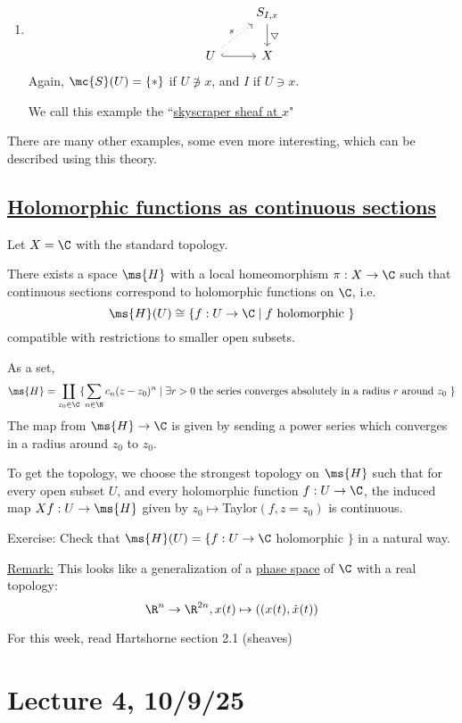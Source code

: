 \documentclass[x11names,reqno,14pt]{extarticle}
\begin{document}
\begin{enumerate}
\item 
\[
\begin{tikzcd}
& S_{I,x} \ar[d, "\bigtriangledown"] \\
U \ar[ur,dotted,"s"] \ar[r,hook] & X 
\end{tikzcd}
\]
Again, $\mc{S}(U) = \{*\}$ if $U \not\ni x$, and $I$ if $U \ni x$. 

We call this example the ``\underline{skyscraper sheaf at $x$}"

\end{enumerate}

There are many other examples, some even more interesting, which can be described using this theory.

\subsection*{\underline{Holomorphic functions as continuous sections}}

Let $X = \C$ with the standard topology. 

\claim

There exists a space $\ms{H}$ with a local homeomorphism $\pi:X\to\C$ such that continuous sections correspond to holomorphic functions on $\C$, i.e. 
\[
\ms{H}(U) \cong \{f:U\to \C \mid f\text{ holomorphic }\}
\]
compatible with restrictions to smaller open subsets. 

\proof

As a set, 
\[
\ms{H} = \coprod_{z_0\in\C}\{\sum_{n\in\N}c_n(z - z_0)^n \mid \exists r > 0 \text{ the series converges absolutely in a radius $r$ around $z_0$ }\}
\]
The map from $\ms{H}\to\C$ is given by sending a power series which converges in a radius around $z_0$ to $z_0$. 

To get the topology, we choose the strongest topology on $\ms{H}$ such that for every open subset $U$, and every holomorphic function $f:U\to\C$, the induced map $Xf:U\to \ms{H}$ given by $z_0 \mapsto $Taylor$(f, z = z_0)$ is continuous. 

Exercise: Check that $\ms{H}(U) = \{f:U\to \C$ holomorphic $\}$ in a natural way. 

\underline{Remark:} This looks like a generalization of a \underline{phase space} of $\C$ with a real topology:
\[
\R^n \to \R^{2n}, x(t) \mapsto ((x(t), \dot{x}(t))
\]

For this week, read Hartshorne section 2.1 (sheaves)

\section*{Lecture 4, 10/9/25}
\end{document}
